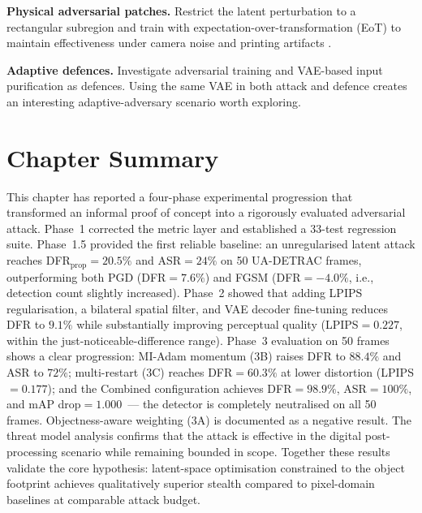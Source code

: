 \documentclass[12pt,a4paper]{report}
\begin{document}
\textbf{Physical adversarial patches.}
Restrict the latent perturbation to a rectangular subregion and train with
expectation-over-transformation (EoT) to maintain effectiveness under camera
noise and printing artifacts \cite{eykholt2018robust}.

\textbf{Adaptive defences.}
Investigate adversarial training and VAE-based input purification as defences.
Using the same VAE in both attack and defence creates an interesting adaptive-adversary
scenario worth exploring.



\section*{Chapter Summary}

This chapter has reported a four-phase experimental progression that
transformed an informal proof of concept into a rigorously evaluated
adversarial attack. Phase~1 corrected the metric layer and established a
33-test regression suite. Phase~1.5 provided the first reliable baseline: an
unregularised latent attack reaches DFR$_{\text{prop}}=20.5\%$ and
ASR$=24\%$ on 50 UA-DETRAC frames, outperforming both PGD
(DFR$=7.6\%$) and FGSM (DFR$=-4.0\%$, i.e., detection count slightly
increased). Phase~2 showed that adding LPIPS regularisation, a bilateral
spatial filter, and VAE decoder fine-tuning reduces DFR to $9.1\%$ while
substantially improving perceptual quality (LPIPS$=0.227$, within the
just-noticeable-difference range). Phase~3 evaluation on 50 frames shows a clear progression: MI-Adam momentum
(3B) raises DFR to $88.4\%$ and ASR to $72\%$; multi-restart (3C) reaches
DFR$=60.3\%$ at lower distortion (LPIPS$=0.177$); and the Combined
configuration achieves DFR$=98.9\%$, ASR$=100\%$, and mAP drop$=1.000$~---
the detector is completely neutralised on all 50 frames.
Objectness-aware weighting (3A) is documented as a negative result.
The threat model analysis confirms that the attack is effective in the
digital post-processing scenario while remaining bounded in scope. Together
these results validate the core hypothesis: latent-space optimisation
constrained to the object footprint achieves qualitatively superior stealth
compared to pixel-domain baselines at comparable attack budget.

\end{document}
